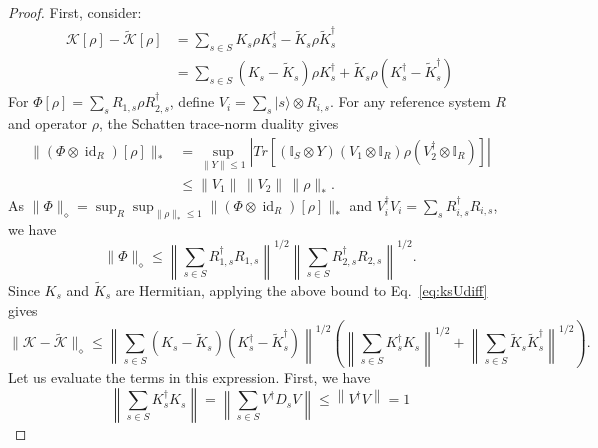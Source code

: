 \documentclass[aps,floatfix,10pt,amssymb,amsfont,amsmath,superscriptaddress,float,nofootinbib,longbibliography,nobalancelastpage,twocolumn]{revtex4-2}
\begin{document}
\begin{proof}
First, consider:
\begin{align}
    \mathcal{K}[\rho] - \tilde{\mathcal{K}}[\rho] &= \sum_{s \in S} K_s\rho K_s^{\dagger} - \tilde K_s\rho \tilde K_s^{\dagger} \\
    &= \sum_{s \in S} (K_s-\tilde K_s)\rho K_s^{\dagger} +\tilde K_s\rho (K_s^{\dagger}- \tilde K_s^{\dagger}) \label{eq:ksUdiff}
\end{align}
For $\Phi[\rho]=\sum_sR_{1,s}\rho R_{2,s}^\dagger$, define
$V_i=\sum_s|s\rangle\otimes R_{i,s}$. For any reference system \(R\)
and operator $\rho$, the Schatten trace-norm duality gives
\begin{align}
\|(\Phi\otimes\operatorname{id}_R)[\rho]\|_*
&=\sup_{\|Y\|\leq1}
\left|Tr\!\left[
(\mathbb I_S\otimes Y)
(V_1\otimes\mathbb I_R) \rho(V_2^\dagger\otimes\mathbb I_R)
\right]\right|\\
&\leq \|V_1\|\,\|V_2\|\,\|\rho\|_*.
\end{align}
As $\|\Phi\|_{\diamond} = \sup_R\sup_{\|\rho\|_*\leq 1}\|(\Phi\otimes\operatorname{id}_R)[\rho]\|_*$ and
\(V_i^\dagger V_i=\sum_sR_{i,s}^\dagger R_{i,s}\), we have
\begin{equation}
\|\Phi\|_\diamond
\leq
\left\|\sum_{s\in S}R_{1,s}^\dagger R_{1,s}\right\|^{1/2}
\left\|\sum_{s\in S}R_{2,s}^\dagger R_{2,s}\right\|^{1/2}.
\end{equation}
Since $K_s$ and $\tilde K_s$ are Hermitian, applying the above bound to Eq.~\eqref{eq:ksUdiff}
gives
\begin{equation}
\|\mathcal{K}-\tilde{\mathcal{K}}\|_\diamond
\leq
\left\|\sum_{s\in S}(K_s - \tilde K_s)(K_s^\dagger - \tilde K_s^\dagger)\right\|^{1/2}
\left(
\left\|\sum_{s\in S}K_s^\dagger K_s\right\|^{1/2}
+
\left\|\sum_{s\in S}\tilde K_s\tilde K_s^\dagger\right\|^{1/2}
\right).
\label{eq:row-column-bound}
\end{equation}
Let us evaluate the terms in this expression. First, we have
\begin{equation}
     \left\|\sum_{s\in S} K_s^{\dagger}  K_s \right\| = \left\|\sum_{s\in S}  V^{\dagger}D_sV \right\| \leq  \left\|V^{\dagger} V\right\| = 1
\end{equation}


\end{proof}
\end{document}
